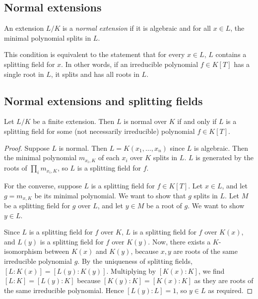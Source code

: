 \subsection{Normal extensions}
\begin{definition}
	An extension \( L / K \) is a \emph{normal extension} if it is algebraic and for all \( x \in L \), the minimal polynomial splits in \( L \).
\end{definition}
\begin{remark}
	This condition is equivalent to the statement that for every \( x \in L \), \( L \) contains a splitting field for \( x \).
	In other words, if an irreducible polynomial \( f \in K[T] \) has a single root in \( L \), it splits and has all roots in \( L \).
\end{remark}

\subsection{Normal extensions and splitting fields}
\begin{theorem}
	Let \( L / K \) be a finite extension.
	Then \( L \) is normal over \( K \) if and only if \( L \) is a splitting field for some (not necessarily irreducible) polynomial \( f \in K[T] \).
\end{theorem}
\begin{proof}
	Suppose \( L \) is normal.
	Then \( L = K(x_1, \dots, x_n) \) since \( L \) is algebraic.
	Then the minimal polynomial \( m_{x_i,K} \) of each \( x_i \) over \( K \) splits in \( L \).
	\( L \) is generated by the roots of \( \prod_i m_{x_i,K} \), so \( L \) is a splitting field for \( f \).

	For the converse, suppose \( L \) is a splitting field for \( f \in K[T] \).
	Let \( x \in L \), and let \( g = m_{x,K} \) be its minimal polynomial.
	We want to show that \( g \) splits in \( L \).
	Let \( M \) be a splitting field for \( g \) over \( L \), and let \( y \in M \) be a root of \( g \).
	We want to show \( y \in L \).

	Since \( L \) is a splitting field for \( f \) over \( K \), \( L \) is a splitting field for \( f \) over \( K(x) \), and \( L(y) \) is a splitting field for \( f \) over \( K(y) \).
	Now, there exists a \( K \)-isomorphism between \( K(x) \) and \( K(y) \), because \( x, y \) are roots of the same irreducible polynomial \( g \).
	By the uniqueness of splitting fields, \( [L:K(x)] = [L(y):K(y)] \).
	Multiplying by \( [K(x):K] \), we find \( [L:K] = [L(y):K] \) because \( [K(y):K] = [K(x):K] \) as they are roots of the same irreducible polynomial.
	Hence \( [L(y):L] = 1 \), so \( y \in L \) as required.
\end{proof}
